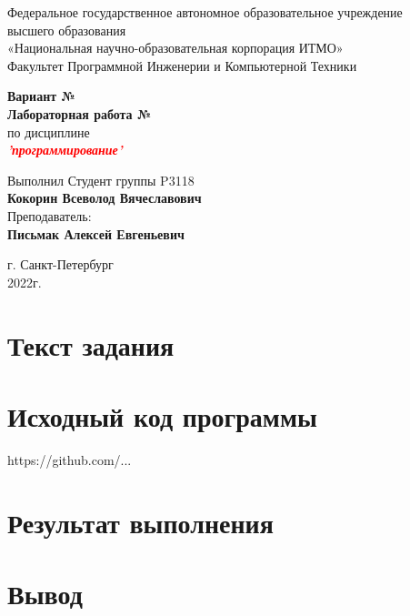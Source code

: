 \documentclass[12pt,onecolumn]{article}
\begin{document}
\begin{center}
    Федеральное государственное автономное образовательное учреждение\\ высшего образования\\
«Национальная научно-образовательная корпорация ИТМО»\\
Факультет Программной Инженерии и Компьютерной Техники \\
\end{center}
\vspace{1cm}


\begin{center}
    \large \textbf{Вариант №}\\
    \textbf{Лабораторная работа №}\\
    по дисциплине\\
    \textbf{\textcolor{red}{\textit{'программирование'}}}
\end{center}

\vspace{2cm}

\begin{flushright}
  Выполнил Студент  группы P3118\\
  \textbf{Кокорин Всеволод Вячеславович}\\
  Преподаватель: \\
  \textbf{Письмак Алексей Евгеньевич}\\
\end{flushright}

\vspace{6cm}
\begin{center}
    г. Санкт-Петербург\\
    2022г.
\end{center}

\newpage
\section{Текст задания}

\section{Исходный код программы}
https://github.com/...

\section{Результат выполнения}

\section{Вывод}
\end{document}
